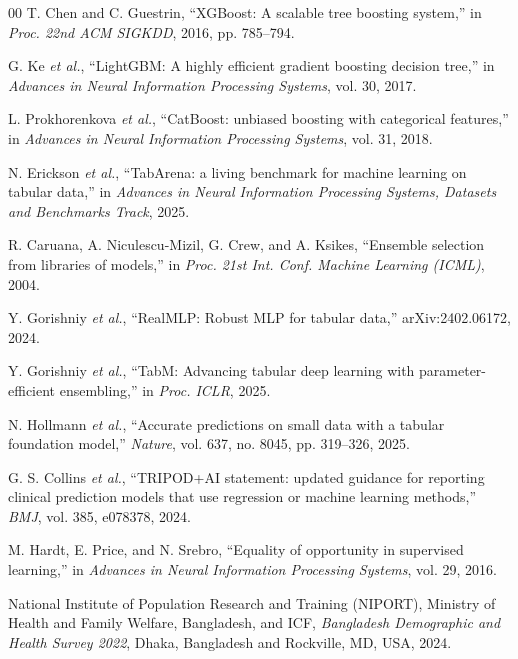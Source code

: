 \documentclass[conference]{IEEEtran}
\begin{document}
\begin{thebibliography}{00}
 T. Chen and C. Guestrin, ``XGBoost: A scalable tree boosting
system,'' in \textit{Proc. 22nd ACM SIGKDD}, 2016, pp. 785--794.

 G. Ke \textit{et al.}, ``LightGBM: A highly efficient
gradient boosting decision tree,'' in \textit{Advances in Neural Information
Processing Systems}, vol. 30, 2017.

 L. Prokhorenkova \textit{et al.}, ``CatBoost: unbiased
boosting with categorical features,'' in \textit{Advances in Neural
Information Processing Systems}, vol. 31, 2018.

 N. Erickson \textit{et al.}, ``TabArena: a living
benchmark for machine learning on tabular data,'' in \textit{Advances in
Neural Information Processing Systems, Datasets and Benchmarks Track}, 2025.

 R. Caruana, A. Niculescu-Mizil, G. Crew, and A. Ksikes,
``Ensemble selection from libraries of models,'' in \textit{Proc. 21st Int.
Conf. Machine Learning (ICML)}, 2004.

 Y. Gorishniy \textit{et al.}, ``RealMLP: Robust MLP for
tabular data,'' arXiv:2402.06172, 2024.

 Y. Gorishniy \textit{et al.}, ``TabM: Advancing tabular deep
learning with parameter-efficient ensembling,'' in \textit{Proc. ICLR}, 2025.

 N. Hollmann \textit{et al.}, ``Accurate predictions on
small data with a tabular foundation model,'' \textit{Nature}, vol. 637,
no. 8045, pp. 319--326, 2025.

 G. S. Collins \textit{et al.}, ``TRIPOD+AI statement:
updated guidance for reporting clinical prediction models that use regression
or machine learning methods,'' \textit{BMJ}, vol. 385, e078378, 2024.

 M. Hardt, E. Price, and N. Srebro, ``Equality of
opportunity in supervised learning,'' in \textit{Advances in Neural
Information Processing Systems}, vol. 29, 2016.

 National Institute of Population Research and Training
(NIPORT), Ministry of Health and Family Welfare, Bangladesh, and ICF,
\textit{Bangladesh Demographic and Health Survey 2022}, Dhaka, Bangladesh
and Rockville, MD, USA, 2024.
\end{thebibliography}
\end{document}
